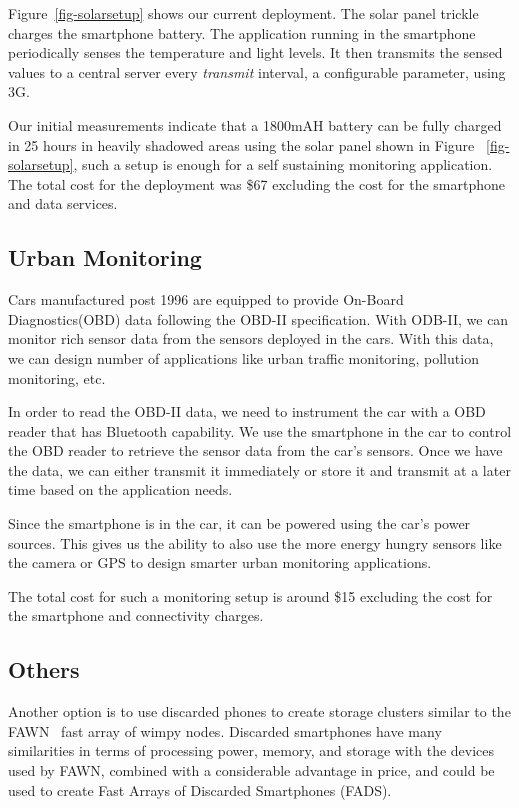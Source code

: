 Figure~\ref{fig-solarsetup} shows our current deployment. The solar panel trickle
charges the smartphone battery. The application running in the smartphone
periodically senses the temperature and light levels. It then transmits the
sensed values to a central server every \textit{transmit} interval, a
configurable parameter, using 3G. 

Our initial measurements indicate that a 1800mAH battery can be fully charged
in 25
hours in heavily shadowed areas using the solar panel shown in Figure 
~\ref{fig-solarsetup}, such a setup is
enough for a self sustaining monitoring application. The total cost for the
deployment was \$67 excluding the cost for the smartphone and data services.

\subsection{Urban Monitoring}
Cars manufactured post 1996 are equipped to provide On-Board Diagnostics(OBD)
data following the OBD-II specification. With ODB-II, we can monitor rich
sensor data from the sensors deployed in the cars. With this data, we can design number of
applications like urban traffic monitoring, pollution monitoring, etc. 

In order to read the OBD-II data, we need to instrument the car
with a OBD reader that has Bluetooth capability. We use the smartphone in the car to control
the OBD reader to retrieve the sensor data from the car's sensors. Once we have
the data, we can either transmit it immediately or store it and transmit at a
later time based on the application needs.

Since the smartphone is in the car, it can be powered using the car's power
sources. This gives us the ability to also use the more energy hungry sensors
like the camera or GPS to design smarter urban monitoring
applications. 

The total cost for such a monitoring setup is around \$15 excluding the cost
for the smartphone and connectivity charges.

\subsection{Others}
Another option is to use discarded phones to create storage clusters similar
to the FAWN~\cite{fawn} fast array of wimpy nodes. Discarded smartphones have
many similarities in terms of processing power, memory, and storage with the
devices used by FAWN, combined with a considerable advantage in price, and
could be used to create Fast Arrays of Discarded Smartphones (FADS).
